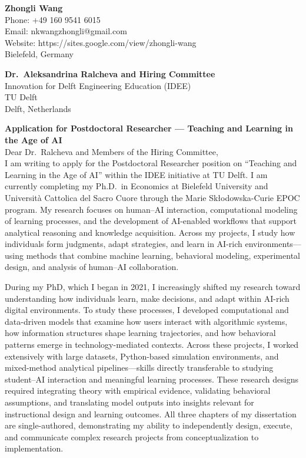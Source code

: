 \documentclass[11pt]{article}
\begin{document}
\noindent
\textbf{Zhongli Wang} \\
Phone: +49 160 9541 6015 \\
Email: nkwangzhongli@gmail.com \\
Website: https://sites.google.com/view/zhongli-wang \\
Bielefeld, Germany \\

\vspace{0.5cm}

\noindent
\textbf{Dr.\ Aleksandrina Ralcheva and Hiring Committee} \\
Innovation for Delft Engineering Education (IDEE) \\
TU Delft \\
Delft, Netherlands \\
\vspace{0.5cm}

\noindent
\textbf{Application for Postdoctoral Researcher — Teaching and Learning in the Age of AI} \\


\noindent Dear Dr.\ Ralcheva and Members of the Hiring Committee,\\[0.2cm]

I am writing to apply for the Postdoctoral Researcher position on “Teaching and Learning in the Age of AI” within the IDEE initiative at TU Delft.  
I am currently completing my Ph.D.\ in Economics at Bielefeld University and Università Cattolica del Sacro Cuore through the Marie Skłodowska-Curie EPOC program.  
My research focuses on human–AI interaction, computational modeling of learning processes, and the development of AI-enabled workflows that support analytical reasoning and knowledge acquisition.  
Across my projects, I study how individuals form judgments, adapt strategies, and learn in AI-rich environments—using methods that combine machine learning, behavioral modeling, experimental design, and analysis of human–AI collaboration.  

During my PhD, which I began in 2021, I increasingly shifted my research toward understanding how individuals learn, make decisions, and adapt within AI-rich digital environments.  
To study these processes, I developed computational and data-driven models that examine how users interact with algorithmic systems, how information structures shape learning trajectories, and how behavioral patterns emerge in technology-mediated contexts.  
Across these projects, I worked extensively with large datasets, Python-based simulation environments, and mixed-method analytical pipelines—skills directly transferable to studying student–AI interaction and meaningful learning processes.  
These research designs required integrating theory with empirical evidence, validating behavioral assumptions, and translating model outputs into insights relevant for instructional design and learning outcomes.  
All three chapters of my dissertation are single-authored, demonstrating my ability to independently design, execute, and communicate complex research projects from conceptualization to implementation.
\end{document}
